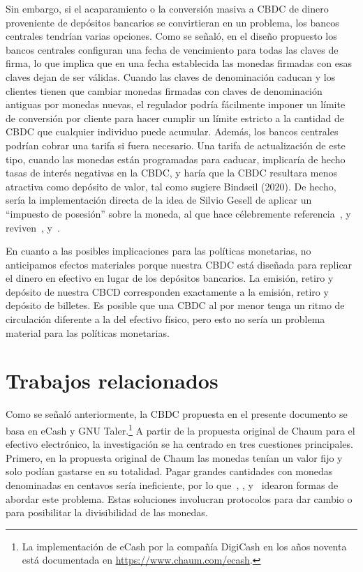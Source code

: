 \documentclass[a4paper,10pt]{article} %
\begin{document}
Sin embargo, si el acaparamiento o la conversión masiva a CBDC de dinero
proveniente de depósitos bancarios se convirtieran en un problema, los bancos
centrales tendrían varias opciones. Como se señaló, en el diseño propuesto los
bancos centrales configuran una fecha de vencimiento para todas las claves de
firma, lo que implica que en una fecha establecida las monedas firmadas con
esas claves dejan de ser válidas. Cuando las claves de denominación caducan y
los clientes tienen que cambiar monedas firmadas con claves de denominación
antiguas por monedas nuevas, el regulador podría fácilmente imponer un límite
de conversión por cliente para hacer cumplir un límite estricto a la cantidad
de CBDC que cualquier individuo puede acumular. Además, los bancos centrales
podrían cobrar una tarifa si fuera necesario. Una tarifa de actualización de
este tipo, cuando las monedas están programadas para caducar, implicaría de
hecho tasas de interés negativas en la CBDC, y haría que la CBDC resultara
menos atractiva como depósito de valor, tal como sugiere Bindseil (2020). De
hecho, sería la implementación directa de la idea de Silvio Gesell de aplicar
un ``impuesto de posesión'' sobre la moneda, al que hace célebremente
referencia~\citet{Keynes}, y reviven~\citet{Goodfriend}, \citet{Buiter}
y~\citet{Agarwal}.

En cuanto a las posibles implicaciones para las políticas monetarias, no
anticipamos efectos materiales porque nuestra CBDC está diseñada para
replicar el dinero en efectivo en lugar de los depósitos bancarios. La
emisión, retiro y depósito de nuestra CBCD corresponden exactamente a la
emisión, retiro y depósito de billetes. Es posible que una CBDC al por
menor tenga un ritmo de circulación diferente a la del efectivo físico,
pero esto no sería un problema material para las políticas monetarias.

\hypertarget{trabajos-relacionados}{%
\section{Trabajos relacionados}\label{6.-trabajos-relacionados}}

Como se señaló anteriormente, la CBDC propuesta en el presente documento se
basa en eCash y GNU Taler.\footnote{La implementación de eCash por la compañía
DigiCash en los años noventa está documentada en
\url{https://www.chaum.com/ecash}.} A partir de la propuesta original de Chaum
para el efectivo electrónico, la investigación se ha centrado en tres
cuestiones principales. Primero, en la propuesta original de Chaum las monedas
tenían un valor fijo y solo podían gastarse en su totalidad. Pagar grandes
cantidades con monedas denominadas en centavos sería ineficiente, por lo
que~\citet{Okamoto}, \citet{Camenisch2005}, \citet{Canard} y~\citet{Dold}
idearon formas de abordar este problema. Estas soluciones involucran
protocolos para dar cambio o para posibilitar la divisibilidad de las monedas.
\end{document}
